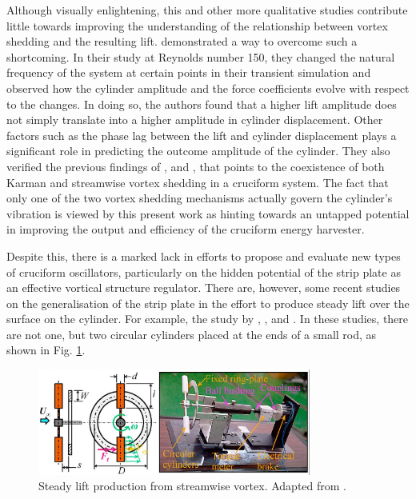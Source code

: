 \documentclass[oneside]{utmthesis}
\begin{document}
Although visually enlightening, this and other more qualitative studies contribute little towards improving the understanding of the relationship between vortex shedding and the resulting lift. \citet{Deng2007} demonstrated a way to overcome such a shortcoming. In their study at Reynolds number 150, they changed the natural frequency of the system at certain points in their transient simulation and observed how the cylinder amplitude and the force coefficients evolve with respect to the changes. In doing so, the authors found that a higher lift amplitude does not simply translate into a higher amplitude in cylinder displacement. Other factors such as the phase lag between the lift and cylinder displacement plays a significant role in predicting the outcome amplitude of the cylinder. They also verified the previous findings of \citet{Shirakashi1989}, \citet{Koide2009} and \citet{Koide2017}, that points to the coexistence of both Karman and streamwise vortex shedding in a cruciform system. The fact that only one of the two vortex shedding mechanisms actually govern the cylinder's vibration is viewed by this present work as hinting towards an untapped potential in improving the output and efficiency of the cruciform energy harvester.

Despite this, there is a marked lack in efforts to propose and evaluate new types of cruciform oscillators, particularly on the hidden potential of the strip plate as an effective vortical structure regulator. There are, however, some recent studies on the generalisation of the strip plate in the effort to produce steady lift over the surface on the cylinder. For example, the study by \citet{Hemsuwan2018a}, \citet{Hemsuwan2018c}, \citet{Hemsuwan2018d} and \citet{Hemsuwan2018b}. In these studies, there are not one, but two circular cylinders placed at the ends of a small rod, as shown in Fig. \ref{fig:hemsuwanTurbine}.

\begin{figure}[!h]
  \centering
  \hspace{1cm} \includegraphics[width=0.8\textwidth]{figs/hemsuwanTurbine}
  \caption{Steady lift production from streamwise vortex. Adapted from \citet{Hemsuwan2021}.}
  \label{fig:hemsuwanTurbine}
\end{figure}
\end{document}
